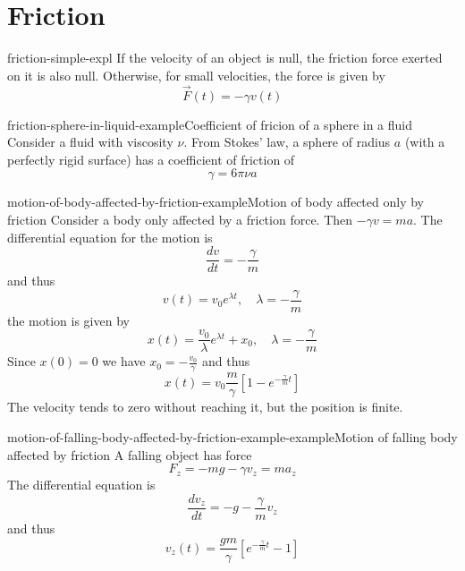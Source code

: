 \documentclass[preview]{standalone}
\begin{document}
\genpage

\section{Friction}

\begin{snippet}{friction-simple-expl}
    If the velocity of an object is null, the friction force exerted on it is also null.
    Otherwise, for small velocities, the force is given by
    \[
        \vec{F}(t) = -\gamma v(t)
    \]
\end{snippet}

\begin{snippetexample}{friction-sphere-in-liquid-example}{Coefficient of fricion of a sphere in a fluid}
    Consider a fluid with viscosity \(\nu\). From Stokes' law, a sphere of radius \(a\) (with a perfectly
    rigid surface) has a coefficient of friction of
    \[
        \gamma = 6\pi\nu a
    \]
\end{snippetexample}

\begin{snippetexample}{motion-of-body-affected-by-friction-example}{Motion of body affected only by friction}
    Consider a body only affected by a friction force. Then \(-\gamma v = ma\).
    The differential equation for the motion is
    \[
        \frac{dv}{dt} = -\frac{\gamma}{m}
    \]
    and thus
    \[
        v(t) = v_0e^{\lambda t}, \quad \lambda = -\frac{\gamma}{m}
    \]
    the motion is given by
    \[
        x(t) = \frac{v_0}{\lambda}e^{\lambda t} + x_0, \quad \lambda = -\frac{\gamma}{m}
    \]
    Since \(x(0)=0\) we have \(x_0 = -\frac{v_0}{\gamma}\) and thus
    \[
        x(t) = v_0 \frac{m}{\gamma}\left[1 - e^{-\frac{\gamma}{m}t}\right]
    \]
    The velocity tends to zero without reaching it, but the position is finite.
\end{snippetexample}

\begin{snippetexample}{motion-of-falling-body-affected-by-friction-example-example}{Motion of falling body affected by friction}
    A falling object has force
    \[
        F_z = -mg - \gamma v_z = ma_z
    \]
    The differential equation is
    \[
        \frac{dv_z}{dt} = -g-\frac{\gamma}{m}v_z
    \]
    and thus
    \[
        v_z(t) = \frac{gm}{\gamma}\left[
            e^{-\frac{\gamma}{m}t} - 1
        \right]
    \]
\end{snippetexample}
\end{document}
